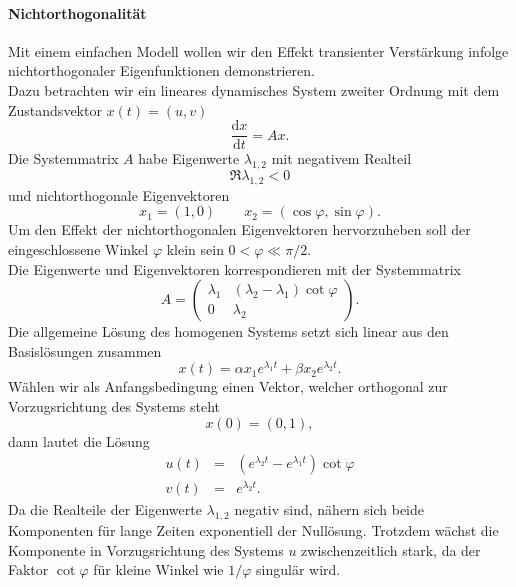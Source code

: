 \documentclass[10pt,a5paper,oneside,draft]{book}
\numberwithin{equation}{chapter}
\begin{document}
\paragraph{Nichtorthogonalit\"at}
Mit einem einfachen Modell wollen wir den Effekt transienter Verst\"arkung infolge nichtorthogonaler Eigenfunktionen demonstrieren.\\
Dazu betrachten wir ein lineares dynamisches System zweiter Ordnung mit dem Zustandsvektor $x(t)=(u,v)$
\begin{equation}
	\frac{\mathrm{d}x}{\mathrm{d}t} = Ax.
\end{equation}
Die Systemmatrix $A$ habe Eigenwerte $\lambda_{1,2}$ mit negativem Realteil
\begin{equation}
	\Re\lambda_{1,2}<0
\end{equation}
und nichtorthogonale Eigenvektoren
\begin{equation}
	x_1 = (1,0) \qquad x_2 = (\cos{\varphi},\sin\varphi).
\end{equation}
Um den Effekt der nichtorthogonalen Eigenvektoren hervorzuheben soll der eingeschlossene Winkel $\varphi$ klein sein $0<\varphi\ll\pi/2$.\\
Die Eigenwerte und Eigenvektoren korrespondieren mit der Systemmatrix
\begin{equation}
	A = \begin{pmatrix}\lambda_1&(\lambda_2-\lambda_1)\cot\varphi\\0&\lambda_2\end{pmatrix}.
\end{equation}
Die allgemeine L\"osung des homogenen Systems setzt sich linear aus den Basisl\"osungen zusammen
\begin{equation}
	x(t) = \alpha x_1 e^{\lambda_1 t} + \beta x_2 e^{\lambda_2 t}.
\end{equation}
W\"ahlen wir als Anfangsbedingung einen Vektor, welcher orthogonal zur Vorzugsrichtung des Systems steht
\begin{equation}
	x(0) = (0,1),
\end{equation}
dann lautet die L\"osung
\begin{eqnarray}
	u(t) &=& (e^{\lambda_2 t} - e^{\lambda_1 t}) \cot\varphi \\
	v(t) &=& e^{\lambda_2 t}.
\end{eqnarray}
Da die Realteile der Eigenwerte $\lambda_{1,2}$ negativ sind, n\"ahern sich beide Komponenten f\"ur lange Zeiten exponentiell der Null\"osung.
Trotzdem w\"achst die Komponente in Vorzugsrichtung des Systems $u$ zwischenzeitlich stark, da der Faktor $\cot\varphi$ f\"ur kleine Winkel wie $1/\varphi$ singul\"ar wird.
\end{document}
